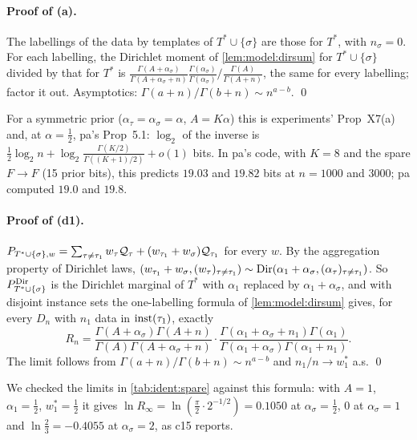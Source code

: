 \paragraph{Proof of (a).} The labellings of the data by templates of $T^*\cup\{\sigma\}$ are those for $T^*$, with $n_\sigma=0$. For each labelling, the Dirichlet moment of \cref{lem:model:dirsum} for $T^*\cup\{\sigma\}$ divided by that for $T^*$ is $\frac{\Gamma(A+\alpha_\sigma)}{\Gamma(A+\alpha_\sigma+n)}\frac{\Gamma(\alpha_\sigma)}{\Gamma(\alpha_\sigma)}\Big/\frac{\Gamma(A)}{\Gamma(A+n)}$, the same for every labelling; factor it out. Asymptotics: $\Gamma(a+n)/\Gamma(b+n)\sim n^{a-b}$. \qed

For a symmetric prior ($\alpha_\tau=\alpha_\sigma=\alpha$, $A=K\alpha$) this is experiments' Prop~X7(a) and, at $\alpha=\frac12$, pa's Prop~5.1: $\log_2$ of the inverse is $\frac12\log_2n+\log_2\frac{\Gamma(K/2)}{\Gamma((K+1)/2)}+o(1)$ bits. In pa's code, with $K=8$ and the spare $F\to F$ (15 prior bits), this predicts $19.03$ and $19.82$ bits at $n=1000$ and $3000$; pa computed $19.0$ and $19.8$.

\paragraph{Proof of (d1).} $P_{T^*\cup\{\sigma\},w}=\sum_{\tau\ne\tau_1}w_\tau\mathcal{Q}_\tau+(w_{\tau_1}+w_\sigma)\mathcal{Q}_{\tau_1}$ for every $w$. By the aggregation property of Dirichlet laws, $(w_{\tau_1}+w_\sigma,(w_\tau)_{\tau\ne\tau_1})\sim\mathrm{Dir}(\alpha_1+\alpha_\sigma,(\alpha_\tau)_{\tau\ne\tau_1})$. So $P^{\mathrm{Dir}}_{T^*\cup\{\sigma\}}$ is the Dirichlet marginal of $T^*$ with $\alpha_1$ replaced by $\alpha_1+\alpha_\sigma$, and with disjoint instance sets the one-labelling formula of \cref{lem:model:dirsum} gives, for every $D_n$ with $n_1$ data in $\mathrm{inst}(\tau_1)$, exactly
\[R_n=\frac{\Gamma(A+\alpha_\sigma)\Gamma(A+n)}{\Gamma(A)\Gamma(A+\alpha_\sigma+n)}\cdot\frac{\Gamma(\alpha_1+\alpha_\sigma+n_1)\Gamma(\alpha_1)}{\Gamma(\alpha_1+\alpha_\sigma)\Gamma(\alpha_1+n_1)}.\]
The limit follows from $\Gamma(a+n)/\Gamma(b+n)\sim n^{a-b}$ and $n_1/n\to w^*_1$ a.s. \qed

We checked the limits in \cref{tab:ident:spare} against this formula: with $A=1$, $\alpha_1=\frac12$, $w^*_1=\frac12$ it gives $\ln R_\infty=\ln(\frac\pi2\cdot2^{-1/2})=0.1050$ at $\alpha_\sigma=\frac12$, $0$ at $\alpha_\sigma=1$ and $\ln\frac23=-0.4055$ at $\alpha_\sigma=2$, as c15 reports.


